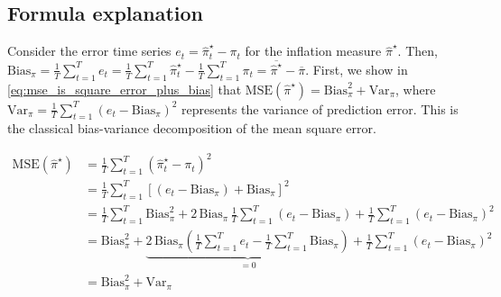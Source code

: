 \subsection{Formula explanation}
\label{appendix:formula_explanation}

\newcommand{\mse}{\text{MSE}(\hat{\pi}^{\star})}
\newcommand{\bias}{\text{Bias}_{\pi}}
\newcommand{\variance}{\text{Var}_\pi}
\newcommand{\sumovert}{\sum_{t=1}^{T}}
\newcommand{\meanovert}{\frac{1}{T}\sum_{t=1}^{T}}
\newcommand{\hatpi}{\hat{\pi}^{\star}}
\newcommand{\barhatpi}{\overline{\hat{\pi}^{\star}}}
\newcommand{\barpi}{\overline{\pi}}
\newcommand{\err}{e}
\newcommand{\spi}{s_{\pi}}
\newcommand{\shatpi}{s_{\hatpi}}
\newcommand{\corr}{r^{\star}}


Consider the error time series $\err_t = \hatpi_t - \pi_t$ for the inflation measure $\hatpi$. Then, $\bias = \meanovert\err_t = \meanovert\hatpi_t - \meanovert\pi_t = \barhatpi-\barpi$. 
First, we show in \ref{eq:mse_is_square_error_plus_bias} that $\mse = \bias^2 + \variance$, where $\variance=\meanovert(\err_t-\bias)^2$ represents the variance of prediction error. This is the classical bias-variance decomposition of the mean square error. 

\begin{equation}
    \begin{aligned}
        \mse & = \meanovert (\hatpi_t - \pi_t)^2\\
        ~ & = \meanovert \left[ (\err_t - \bias) + \bias \right]^2 \\
        ~ & = \meanovert\bias^2 + 2\,\bias\,\meanovert(\err_t-\bias) + \meanovert(\err_t-\bias)^2  \\
        ~ & = \bias^2 + \underbrace{2\,\bias\left(\meanovert\err_t - \meanovert\bias\right)}_{=0} + \meanovert(\err_t-\bias)^2\\
        ~ & = \bias^2 + \variance
    \end{aligned}
    \label{eq:mse_is_square_error_plus_bias}
\end{equation}

